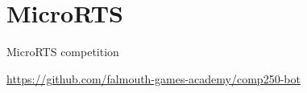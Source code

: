 \part{MicroRTS}
\frame{\partpage}

\begin{frame}{MicroRTS competition}
	\begin{center}
		\url{https://github.com/falmouth-games-academy/comp250-bot}
	\end{center}
\end{frame}
